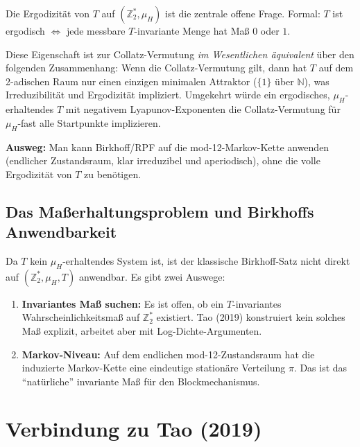 \documentclass[12pt,a4paper]{article}
\newcommand{\N}{\mathbb{N}}
\newcommand{\Ztwo}{\mathbb{Z}_2}
\begin{document}
\begin{tcolorbox}[lücke, title={Hauptproblem: Ergodizität}]
Die Ergodizität von $T$ auf $(\Ztwo^*, \mu_H)$ ist die zentrale offene
Frage. Formal: $T$ ist ergodisch $\Leftrightarrow$ jede messbare
$T$-invariante Menge hat Maß $0$ oder $1$.

\medskip
Diese Eigenschaft ist zur Collatz-Vermutung \emph{im Wesentlichen
äquivalent} über den folgenden Zusammenhang: Wenn die Collatz-Vermutung
gilt, dann hat $T$ auf dem 2-adischen Raum nur einen einzigen minimalen
Attraktor ($\{1\}$ über $\N$), was Irreduzibilität und Ergodizität impliziert.
Umgekehrt würde ein ergodisches, $\mu_H$-erhaltendes $T$ mit negativem
Lyapunov-Exponenten die Collatz-Vermutung für $\mu_H$-fast alle Startpunkte
implizieren.

\medskip
\textbf{Ausweg:} Man kann Birkhoff/RPF auf die mod-12-Markov-Kette
anwenden (endlicher Zustandsraum, klar irreduzibel und aperiodisch), ohne
die volle Ergodizität von $T$ zu benötigen.
\end{tcolorbox}

\subsection{Das Maßerhaltungsproblem und Birkhoffs Anwendbarkeit}

Da $T$ kein $\mu_H$-erhaltendes System ist, ist der klassische Birkhoff-Satz
nicht direkt auf $(\Ztwo^*, \mu_H, T)$ anwendbar. Es gibt zwei Auswege:

\begin{enumerate}[label=(\arabic*)]
  \item \textbf{Invariantes Maß suchen:} Es ist offen, ob ein $T$-invariantes
    Wahrscheinlichkeitsmaß auf $\Ztwo^*$ existiert. Tao (2019) konstruiert
    kein solches Maß explizit, arbeitet aber mit Log-Dichte-Argumenten.
  \item \textbf{Markov-Niveau:} Auf dem endlichen mod-12-Zustandsraum hat die
    induzierte Markov-Kette eine eindeutige stationäre Verteilung $\pi$.
    Das ist das ``natürliche'' invariante Maß für den Blockmechanismus.
\end{enumerate}

\section{Verbindung zu Tao (2019)}
\label{sec:tao}
\end{document}
